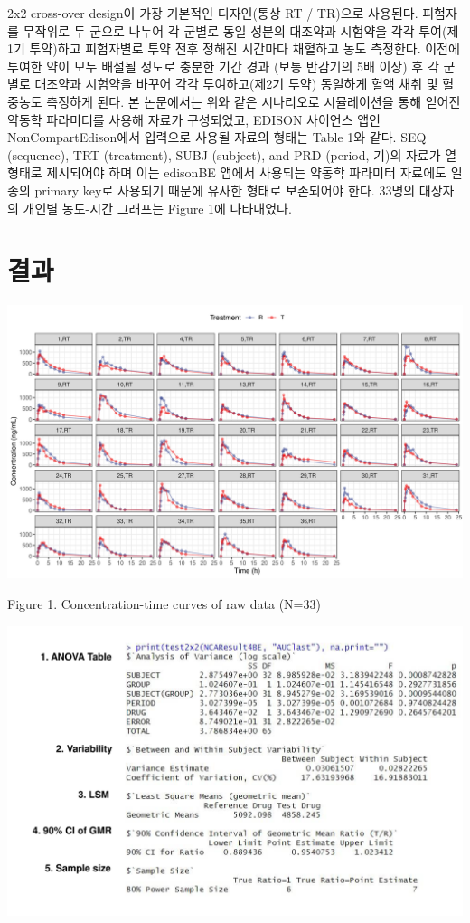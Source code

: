 \documentclass[12pt,]{krantz}
\begin{document}
2x2 cross-over design이 가장 기본적인 디자인(통상 RT / TR)으로 사용된다. 피험자를 무작위로 두 군으로 나누어 각 군별로 동일 성분의 대조약과 시험약을 각각 투여(제1기 투약)하고 피험자별로 투약 전후 정해진 시간마다 채혈하고 농도 측정한다. 이전에 투여한 약이 모두 배설될 정도로 충분한 기간 경과 (보통 반감기의 5배 이상) 후 각 군별로 대조약과 시험약을 바꾸어 각각 투여하고(제2기 투약) 동일하게 혈액 채취 및 혈중농도 측정하게 된다.
본 논문에서는 위와 같은 시나리오로 시뮬레이션을 통해 얻어진 약동학 파라미터를 사용해 자료가 구성되었고, EDISON 사이언스 앱인 NonCompartEdison에서 입력으로 사용될 자료의 형태는 Table 1와 같다. SEQ (sequence), TRT (treatment), SUBJ (subject), and PRD (period, 기)의 자료가 열 형태로 제시되어야 하며 이는 edisonBE 앱에서 사용되는 약동학 파라미터 자료에도 일종의 primary key로 사용되기 때문에 유사한 형태로 보존되어야 한다. 33명의 대상자의 개인별 농도-시간 그래프는 Figure 1에 나타내었다.

\hypertarget{result}{%
\chapter{결과}\label{result}}

\includegraphics{assets-paper/figure-1.png}

Figure 1. Concentration-time curves of raw data (N=33)

\includegraphics{assets-paper/figure-2.png}
\end{document}
